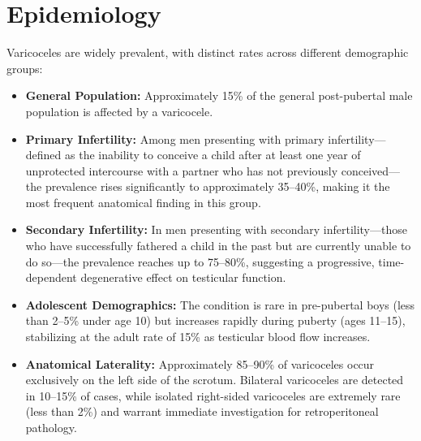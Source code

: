 \section*{Epidemiology}
Varicoceles are widely prevalent, with distinct rates across different demographic groups:
\begin{itemize}
  \item \textbf{General Population:} Approximately 15\% of the general post-pubertal male population is affected by a varicocele.
  \item \textbf{Primary Infertility:} Among men presenting with primary infertility---defined as the inability to conceive a child after at least one year of unprotected intercourse with a partner who has not previously conceived---the prevalence rises significantly to approximately 35--40\%, making it the most frequent anatomical finding in this group.
  \item \textbf{Secondary Infertility:} In men presenting with secondary infertility---those who have successfully fathered a child in the past but are currently unable to do so---the prevalence reaches up to 75--80\%, suggesting a progressive, time-dependent degenerative effect on testicular function.
  \item \textbf{Adolescent Demographics:} The condition is rare in pre-pubertal boys (less than 2--5\% under age 10) but increases rapidly during puberty (ages 11--15), stabilizing at the adult rate of 15\% as testicular blood flow increases.
  \item \textbf{Anatomical Laterality:} Approximately 85--90\% of varicoceles occur exclusively on the left side of the scrotum. Bilateral varicoceles are detected in 10--15\% of cases, while isolated right-sided varicoceles are extremely rare (less than 2\%) and warrant immediate investigation for retroperitoneal pathology.
\end{itemize}

